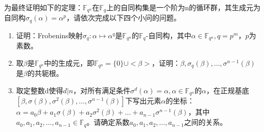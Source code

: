 为最终证明如下的定理：$\mathbb{F}_{q^n}$在$\mathbb{F}_{q}$上的自同构集是一个阶为n的循环群，其生成元为自同构$\sigma_q(\alpha)=\alpha^p$，请依次完成以下四个小问的问题。
\begin{enumerate}
    \item 证明：Frobenins映射$\sigma_q:\alpha\mapsto\alpha^q$是$\mathbb{F}_{q^n}$的$\mathbb{F}_{q}$-自同构，其中$\alpha\in\mathbb{F}_{q^n}, q=p^m$，$p$为素数。


    \item 取$\beta$是$\mathbb{F}_{q^n}$中的生成元，即$\mathbb{F}_{q^n}=\{0\}\cup<\beta>$，证明：$\beta,\sigma_q(\beta),\dots,\sigma^{n-1}(\beta)$是$\beta$的共轭根。
    


    \item 取定整数d使得$d|n$，对所有满足条件$\sigma^d(\alpha)=\alpha, \alpha\in\mathbb{F}_{q^n}$的$\alpha$，在正规基底$[\beta,\sigma(\beta),\sigma^2(\beta),\dots,\sigma^{n-1}(\beta)]$下写出元素$\alpha$的坐标：$\alpha=a_0\beta+a_1\sigma(\beta)+a_2\sigma^2(\beta)+\dots+a_{n-1}\sigma^{n-1}(\beta)$，其中$a_0,a_1,a_2,\dots,a_{n-1}\in\mathbb{F}_{q}$。请确定系数$a_0,a_1,a_2,\dots,a_{n-1}$之间的关系。
\end{enumerate}